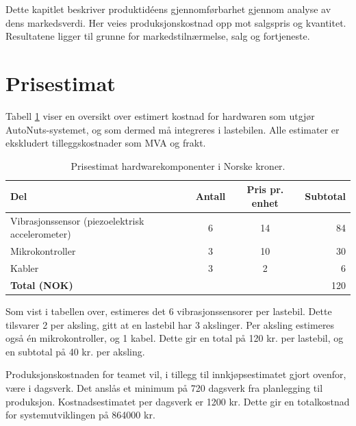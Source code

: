 Dette kapitlet beskriver produktidéens gjennomførbarhet gjennom analyse av 
dens markedsverdi. Her veies produksjonskostnad opp mot salgspris og kvantitet.
Resultatene ligger til grunne for markedstilnærmelse, salg og fortjeneste.

\section{Prisestimat}
Tabell \ref{tab:price-HW} viser en oversikt over estimert kostnad for 
hardwaren som utgjør AutoNuts-systemet, og som dermed må integreres i lastebilen. Alle estimater er ekskludert tilleggskostnader som MVA og frakt.
\newline
\begin{table}[H]
\caption{Prisestimat hardwarekomponenter i Norske kroner.}
\label{tab:price-HW}
\begin{tabularx}{\textwidth}{lcc|r}
	{\bf Del} & {\bf Antall} & {\bf Pris pr. enhet} & {\bf Subtotal}\\
	\hline
	Vibrasjonssensor (piezoelektrisk accelerometer) & 6 & 14 & 84\\
	Mikrokontroller & 3 & 10 & 30\\
	Kabler & 3 & 2 & 6\\
	\hline
	\multicolumn{3}{l}{{\bf Total (NOK)}} &\multicolumn{1}{r}{120}\\
	\hline \hline
\end{tabularx} 
\end{table}

Som vist i tabellen over, estimeres det 6 vibrasjonssensorer per lastebil. Dette
tilsvarer 2 per aksling, gitt at en lastebil har 3 akslinger. Per aksling 
estimeres også én mikrokontroller, og 1 kabel. Dette gir en 
total på 120 kr. per lastebil, og en subtotal på 40 kr. per aksling. \cite{PCBmail}

Produksjonskostnaden for teamet vil, i tillegg til innkjøpsestimatet gjort 
ovenfor, være i dagsverk. Det anslås et minimum på 720 dagsverk fra 
planlegging til produksjon. Kostnadsestimatet per dagsverk er 1200 kr. Dette gir en totalkostnad for systemutviklingen på 864000 kr.

